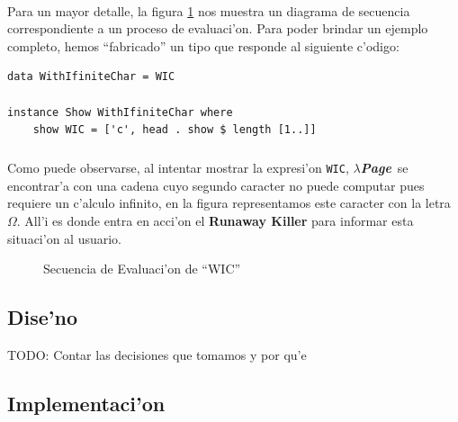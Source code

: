 \documentclass[a4paper]{article}
\newcommand{\hpage}{\textbf{\textsl{$\lambda$Page}}}
\begin{document}
\paragraph{}Para un mayor detalle, la figura \ref{seq1} nos muestra un diagrama de secuencia correspondiente a un proceso de evaluaci'on.  Para poder brindar un ejemplo completo, hemos ``fabricado'' un tipo que responde al siguiente c'odigo:
\lstset{language=haskell, frame=single, tabsize=4}
\begin{lstlisting}
data WithIfiniteChar = WIC

instance Show WithIfiniteChar where
    show WIC = ['c', head . show $ length [1..]]
\end{lstlisting}
\subparagraph{}Como puede observarse, al intentar mostrar la expresi'on \texttt{WIC}, \hpage\ se encontrar'a con una cadena cuyo segundo caracter no puede computar pues requiere un c'alculo infinito, en la figura representamos este caracter con la letra $\Omega$.  All'i es donde entra en acci'on el \textbf{Runaway Killer} para informar esta situaci'on al usuario.
\begin{figure}[htbp]
	\begin{center}
		\caption{Secuencia de Evaluaci'on de ``WIC''}
		\label{seq1}
	\end{center}
\end{figure}

\subsection{Dise'no} TODO: Contar las decisiones que tomamos y por qu'e
\subsection{Implementaci'on}
\end{document}
